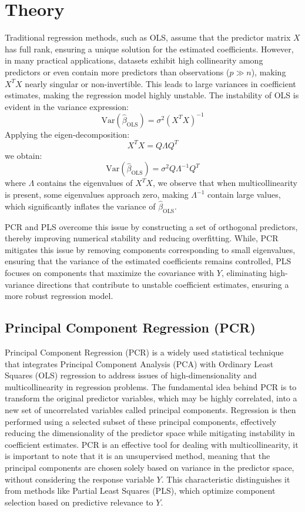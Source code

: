 \documentclass[11pt,twoside,a4paper]{article}
\begin{document}
\section{Theory}

Traditional regression methods, such as OLS, assume that the predictor matrix \( X \) has full rank, ensuring a unique solution for the estimated coefficients. However, in many practical applications, datasets exhibit high collinearity among predictors or even contain more predictors than observations (\( p \gg n \)), making \( X^T X \) nearly singular or non-invertible. This leads to large variances in coefficient estimates, making the regression model highly unstable. The instability of OLS is evident in the variance expression:
\[
\text{Var}(\hat{\beta}_{\text{OLS}}) = \sigma^2 (X^T X)^{-1}
\]
Applying the eigen-decomposition:
\[
X^T X = Q \Lambda Q^T
\]
we obtain:
\[
\text{Var}(\hat{\beta}_{\text{OLS}}) = \sigma^2 Q \Lambda^{-1} Q^T
\]
where \( \Lambda \) contains the eigenvalues of \( X^T X \), we observe that when multicollinearity is present, some eigenvalues approach zero, making \( \Lambda^{-1} \) contain large values, which significantly inflates the variance of \( \hat{\beta}_{\text{OLS}} \).

PCR and PLS overcome this issue by constructing a set of orthogonal predictors, thereby improving numerical stability and reducing overfitting. While,  PCR mitigates this issue by removing components corresponding to small eigenvalues, ensuring that the variance of the estimated coefficients remains controlled, PLS focuses on components that maximize the covariance with \( Y \), eliminating high-variance directions that contribute to unstable coefficient estimates, ensuring a more robust regression model.


\subsection{Principal Component Regression (PCR)}

Principal Component Regression (PCR) is a widely used statistical technique that integrates Principal Component Analysis (PCA) with Ordinary Least Squares (OLS) regression to address issues of high-dimensionality and multicollinearity in regression problems. The fundamental idea behind PCR is to transform the original predictor variables, which may be highly correlated, into a new set of uncorrelated variables called principal components. Regression is then performed using a selected subset of these principal components, effectively reducing the dimensionality of the predictor space while mitigating instability in coefficient estimates.
PCR is an effective tool for dealing with multicollinearity, it is important to note that it is an unsupervised method, meaning that the principal components are chosen solely based on variance in the predictor space, without considering the response variable \( Y \). This characteristic distinguishes it from methods like Partial Least Squares (PLS), which optimize component selection based on predictive relevance to \( Y \).
\end{document}
